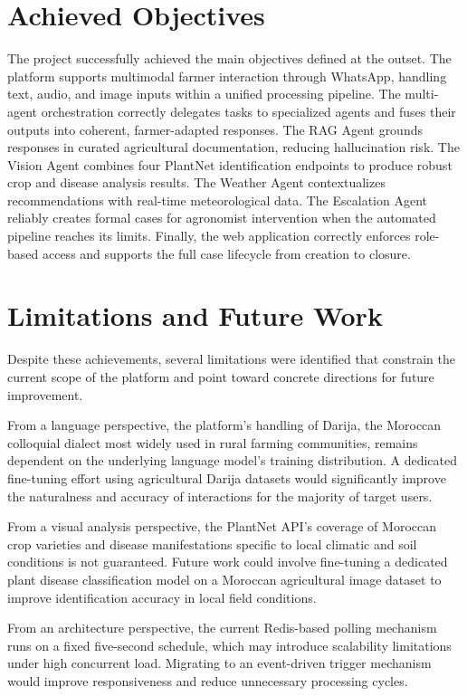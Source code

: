 \section{Achieved Objectives}

The project successfully achieved the main objectives defined at the outset. The platform supports multimodal farmer interaction through WhatsApp, handling text, audio, and image inputs within a unified processing pipeline. The multi-agent orchestration correctly delegates tasks to specialized agents and fuses their outputs into coherent, farmer-adapted responses. The RAG Agent grounds responses in curated agricultural documentation, reducing hallucination risk. The Vision Agent combines four PlantNet identification endpoints to produce robust crop and disease analysis results. The Weather Agent contextualizes recommendations with real-time meteorological data. The Escalation Agent reliably creates formal cases for agronomist intervention when the automated pipeline reaches its limits. Finally, the web application correctly enforces role-based access and supports the full case lifecycle from creation to closure.

\section{Limitations and Future Work}

Despite these achievements, several limitations were identified that constrain the current scope of the platform and point toward concrete directions for future improvement.

From a language perspective, the platform's handling of Darija, the Moroccan colloquial dialect most widely used in rural farming communities, remains dependent on the underlying language model's training distribution. A dedicated fine-tuning effort using agricultural Darija datasets would significantly improve the naturalness and accuracy of interactions for the majority of target users.

From a visual analysis perspective, the PlantNet API's coverage of Moroccan crop varieties and disease manifestations specific to local climatic and soil conditions is not guaranteed. Future work could involve fine-tuning a dedicated plant disease classification model on a Moroccan agricultural image dataset to improve identification accuracy in local field conditions.

From an architecture perspective, the current Redis-based polling mechanism runs on a fixed five-second schedule, which may introduce scalability limitations under high concurrent load. Migrating to an event-driven trigger mechanism would improve responsiveness and reduce unnecessary processing cycles.

